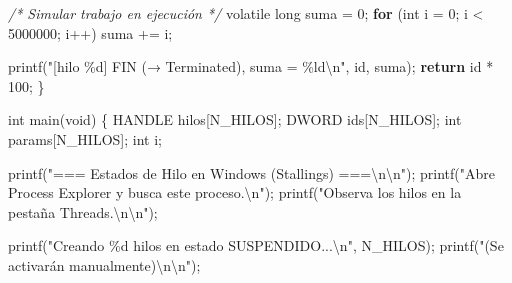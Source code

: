 \documentclass[
  spanish,
]{article}
\newenvironment{Shaded}{}{}
\newcommand{\CommentTok}[1]{\textcolor[rgb]{0.38,0.63,0.69}{\textit{#1}}}
\newcommand{\ControlFlowTok}[1]{\textcolor[rgb]{0.00,0.44,0.13}{\textbf{#1}}}
\newcommand{\DataTypeTok}[1]{\textcolor[rgb]{0.56,0.13,0.00}{#1}}
\newcommand{\DecValTok}[1]{\textcolor[rgb]{0.25,0.63,0.44}{#1}}
\newcommand{\NormalTok}[1]{#1}
\newcommand{\OperatorTok}[1]{\textcolor[rgb]{0.40,0.40,0.40}{#1}}
\newcommand{\SpecialCharTok}[1]{\textcolor[rgb]{0.25,0.44,0.63}{#1}}
\newcommand{\StringTok}[1]{\textcolor[rgb]{0.25,0.44,0.63}{#1}}
\begin{document}
\begin{Shaded}
\begin{Highlighting}[]
    \CommentTok{/* Simular trabajo en ejecución */}
    \DataTypeTok{volatile} \DataTypeTok{long}\NormalTok{ suma }\OperatorTok{=} \DecValTok{0}\OperatorTok{;}
    \ControlFlowTok{for} \OperatorTok{(}\DataTypeTok{int}\NormalTok{ i }\OperatorTok{=} \DecValTok{0}\OperatorTok{;}\NormalTok{ i }\OperatorTok{\textless{}} \DecValTok{5000000}\OperatorTok{;}\NormalTok{ i}\OperatorTok{++)}
\NormalTok{        suma }\OperatorTok{+=}\NormalTok{ i}\OperatorTok{;}

\NormalTok{    printf}\OperatorTok{(}\StringTok{"[hilo }\SpecialCharTok{\%d}\StringTok{] FIN (→ Terminated), suma = }\SpecialCharTok{\%ld\textbackslash{}n}\StringTok{"}\OperatorTok{,}\NormalTok{ id}\OperatorTok{,}\NormalTok{ suma}\OperatorTok{);}
    \ControlFlowTok{return}\NormalTok{ id }\OperatorTok{*} \DecValTok{100}\OperatorTok{;}
\OperatorTok{\}}

\DataTypeTok{int}\NormalTok{ main}\OperatorTok{(}\DataTypeTok{void}\OperatorTok{)} \OperatorTok{\{}
\NormalTok{    HANDLE hilos}\OperatorTok{[}\NormalTok{N\_HILOS}\OperatorTok{];}
\NormalTok{    DWORD ids}\OperatorTok{[}\NormalTok{N\_HILOS}\OperatorTok{];}
    \DataTypeTok{int}\NormalTok{ params}\OperatorTok{[}\NormalTok{N\_HILOS}\OperatorTok{];}
    \DataTypeTok{int}\NormalTok{ i}\OperatorTok{;}

\NormalTok{    printf}\OperatorTok{(}\StringTok{"=== Estados de Hilo en Windows (Stallings) ===}\SpecialCharTok{\textbackslash{}n\textbackslash{}n}\StringTok{"}\OperatorTok{);}
\NormalTok{    printf}\OperatorTok{(}\StringTok{"Abre Process Explorer y busca este proceso.}\SpecialCharTok{\textbackslash{}n}\StringTok{"}\OperatorTok{);}
\NormalTok{    printf}\OperatorTok{(}\StringTok{"Observa los hilos en la pestaña Threads.}\SpecialCharTok{\textbackslash{}n\textbackslash{}n}\StringTok{"}\OperatorTok{);}

\NormalTok{    printf}\OperatorTok{(}\StringTok{"Creando }\SpecialCharTok{\%d}\StringTok{ hilos en estado SUSPENDIDO...}\SpecialCharTok{\textbackslash{}n}\StringTok{"}\OperatorTok{,}\NormalTok{ N\_HILOS}\OperatorTok{);}
\NormalTok{    printf}\OperatorTok{(}\StringTok{"(Se activarán manualmente)}\SpecialCharTok{\textbackslash{}n\textbackslash{}n}\StringTok{"}\OperatorTok{);}


\end{Highlighting}
\end{Shaded}
\end{document}
